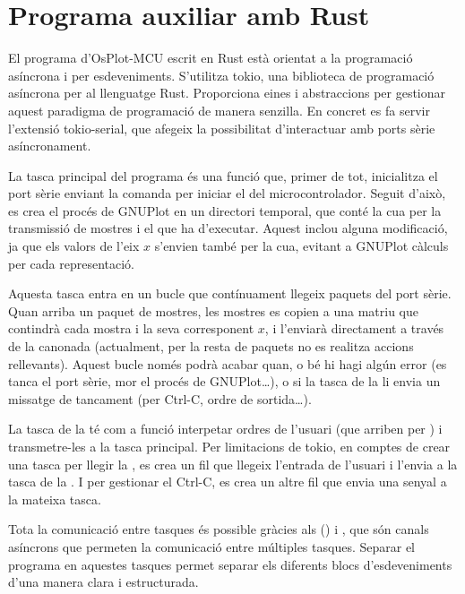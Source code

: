 \documentclass{tfgitic}[2023/06/30]
\begin{document}
\section{Programa auxiliar amb Rust}

El programa d'OsPlot-MCU escrit en Rust està orientat a la programació
asíncrona i per esdeveniments. S'utilitza tokio, una biblioteca de
programació asíncrona per al llenguatge Rust. Proporciona eines i
abstraccions per gestionar aquest paradigma de programació de manera
senzilla. En concret es fa servir l'extensió tokio-serial, que afegeix
la possibilitat d'interactuar amb ports sèrie asíncronament.

\newpage

La tasca principal del programa és una funció que, primer de tot,
inicialitza el port sèrie enviant la comanda per iniciar el
 del microcontrolador. Seguit d'això, es crea el procés
de GNUPlot en un directori temporal, que conté la cua per la
transmissió de mostres i el  que ha d'executar. Aquest
 inclou alguna modificació, ja que els valors de l'eix $x$
s'envien també per la cua, evitant a GNUPlot càlculs per cada
representació.

Aquesta tasca entra en un bucle que contínuament llegeix paquets del
port sèrie. Quan arriba un paquet de mostres, les mostres es copien a
una matriu que contindrà cada mostra i la seva corresponent $x$, i
l'enviarà directament a través de la canonada (actualment, per la
resta de paquets no es realitza accions rellevants). Aquest bucle
només podrà acabar quan, o bé hi hagi algún error (es tanca el port
sèrie, mor el procés de GNUPlot\dots), o si la tasca de la 
li envia un missatge de tancament (per Ctrl-C, ordre de sortida\dots).

La tasca de la  té com a funció interpetar ordres de
l'usuari (que arriben per ) i transmetre-les a la tasca
principal.  Per limitacions de tokio, en comptes de crear una tasca
per llegir la , es crea un fil que llegeix l'entrada de
l'usuari i l'envia a la tasca de la . I per gestionar el
Ctrl-C, es crea un altre fil que envia una senyal a la mateixa tasca.

Tota la comunicació entre tasques és possible gràcies als 
() i , que són
canals asíncrons que permeten la comunicació entre múltiples
tasques. Separar el programa en aquestes tasques permet separar els
diferents blocs d'esdeveniments d'una manera clara i estructurada.
\end{document}
